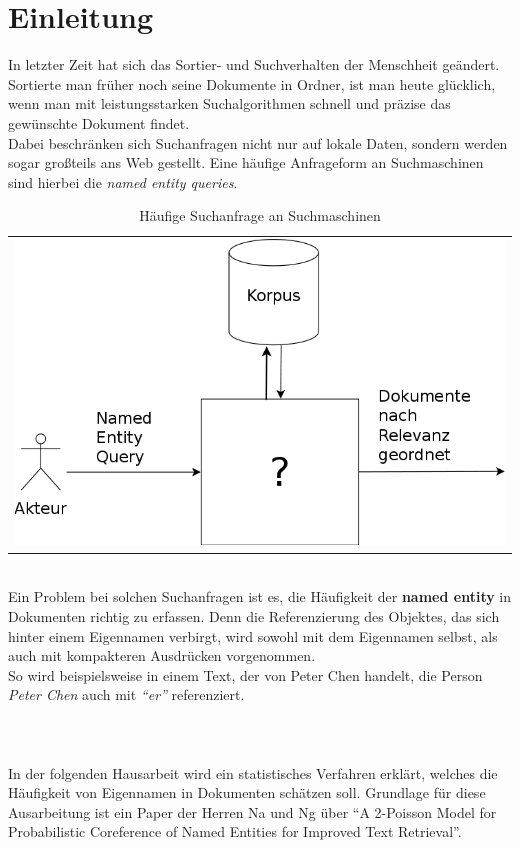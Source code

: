 \section{Einleitung}
In letzter Zeit hat sich das Sortier- und Suchverhalten der Menschheit geändert. Sortierte man früher noch seine Dokumente in Ordner, ist man heute glücklich, wenn man mit leistungsstarken Suchalgorithmen schnell und präzise das gewünschte Dokument findet.\\
Dabei beschränken sich Suchanfragen nicht nur auf lokale Daten, sondern werden sogar großteils ans Web gestellt. Eine häufige Anfrageform an Suchmaschinen sind hierbei die \textit{named entity queries}\cite{paper:Guha}.\\
\begin{table}[h]
	\centering
	\begin{tabular}{c}
		\includegraphics[scale=.2]{pics/overview}
	\end{tabular}
	\caption{Häufige Suchanfrage an Suchmaschinen}
	\label{tab:freq_query}
\end{table}\\
Ein Problem bei solchen Suchanfragen ist es, die Häufigkeit der \textbf{named entity} in Dokumenten richtig zu erfassen\cite{paper:Na}.
Denn die Referenzierung des Objektes, das sich hinter einem Eigennamen verbirgt, wird sowohl mit dem Eigennamen selbst, als auch mit kompakteren Ausdrücken vorgenommen.\\
So wird beispielsweise in einem Text, der von Peter Chen handelt, die Person \textit{Peter Chen} auch mit \textit{"`er"'} referenziert.\\
\\
\\
\\
In der folgenden Hausarbeit wird ein statistisches Verfahren erklärt, welches die Häufigkeit von Eigennamen in Dokumenten schätzen soll. Grundlage für diese Ausarbeitung ist ein Paper der Herren Na und Ng über "`A 2-Poisson Model for Probabilistic Coreference of Named Entities for Improved Text Retrieval"'\cite{paper:Na}.

